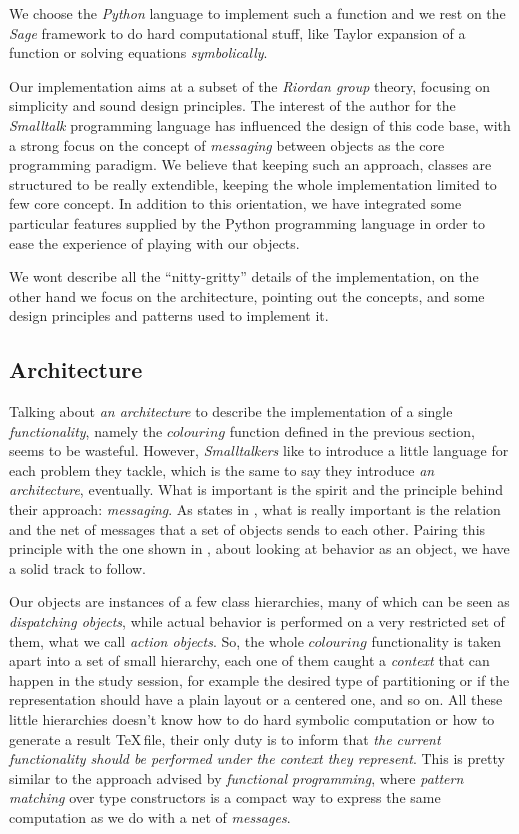 We choose the \emph{Python} language to implement such a function and we rest
on the \emph{Sage} \cite{sage} framework to do hard computational stuff, like
Taylor expansion of a function or solving equations \emph{symbolically}.

Our implementation aims at a subset of the \emph{Riordan group} theory, focusing
on simplicity and sound design principles. The interest of the author for the
\emph{Smalltalk} programming language has influenced the design of this code
base, with a strong focus on the concept of \emph{messaging} between objects as
the core programming paradigm. We believe that keeping such an approach,
classes are structured to be really extendible, keeping the whole
implementation limited to few core concept. In addition to this orientation, we
have integrated some particular features supplied by the Python programming
language in order to ease the experience of playing with our objects.

We wont describe all the ``nitty-gritty'' details of the implementation, on the
other hand we focus on the architecture, pointing out the concepts, and some
design principles and patterns used to implement it.

\subsection{Architecture}

Talking about \emph{an architecture} to describe the implementation of a single
\emph{functionality}, namely the $colouring$ function defined in the previous
section, seems to be wasteful. However, \emph{Smalltalkers} like to introduce a
little language for each problem they tackle, which is the same to say they
introduce \emph{an architecture}, eventually. What is important is the spirit
and the principle behind their approach: \emph{messaging}. As
\citeauthor{kay:on:messaging} states in \cite{kay:on:messaging}, what is really
important is the relation and the net of messages that a set of objects sends
to each other. Pairing this principle with the one shown in
\cite{friedman:felleisen:few:java:few:patterns}, about looking at behavior as
an object, we have a solid track to follow.

Our objects are instances of a few class hierarchies, many of which can be seen
as \emph{dispatching objects}, while actual behavior is performed on a very
restricted set of them, what we call \emph{action objects}. So, the whole
$colouring$ functionality is taken apart into a set of small hierarchy, each
one of them caught a \emph{context} that can happen in the study session, for
example the desired type of partitioning or if the representation should have a
plain layout or a centered one, and so on. All these little hierarchies doesn't
know how to do hard symbolic computation or how to generate a result
\TeX\,file, their only duty is to inform that \emph{the current functionality
should be performed under the context they represent}. This is pretty similar
to the approach advised by \emph{functional programming}, where \emph{pattern
matching} over type constructors is a compact way to express the same
computation as we do with a net of \emph{messages}.

